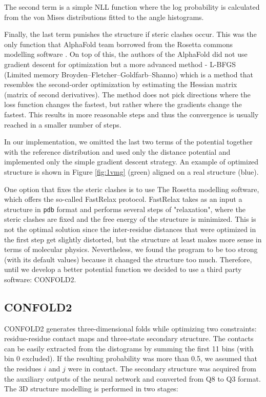 The second term is a simple NLL function where the log probability is calculated from the von Mises distributions fitted to the angle histograms.

Finally, the last term punishes the structure if steric clashes occur. This was the only function that AlphaFold team borrowed from the Rosetta commons modelling software \cite{rosettacommons}. On top of this, the authors of the AlphaFold did not use gradient descent for optimization but a more advanced method - L-BFGS (Limited memory Broyden–Fletcher–Goldfarb–Shanno) which is a method that resembles the second-order optimization by estimating the Hessian matrix (matrix of second derivatives). The method does not pick directions where the loss function changes the fastest, but rather where the gradients change the fastest. This results in more reasonable steps and thus the convergence is usually reached in a smaller number of steps.

In our implementation, we omitted the last two terms of the potential together with the reference distribution and used only the distance potential and implemented only the simple gradient descent strategy. An example of optimized structure is shown in Figure \ref{fig:1vmg} (green) aligned on a real structure (blue). 

One option that fixes the steric clashes is to use The Rosetta modelling software, which offers the so-called FastRelax protocol. 
FastRelax takes as an input a structure in \texttt{pdb} format and performs several steps of "relaxation", where the steric clashes are fixed and the free energy of the structure is minimized. 
This is not the optimal solution since the inter-residue distances that were optimized in the first step get slightly distorted, but the structure at least makes more sense in terms of molecular physics. 
Nevertheless, we found the program to be too strong (with its default values) because it changed the structure too much.
Therefore, until we develop a better potential function we decided to use a third party software: CONFOLD2. 

\subsection{CONFOLD2}

CONFOLD2 generates three-dimensional folds while optimizing two constraints: residue-residue contact maps and three-state secondary structure.
The contacts can be easily extracted from the distograms by summing the first 11 bins (with bin 0 excluded).
If the resulting probability was more than 0.5, we assumed that the residues $i$ and $j$ were in contact.
The secondary structure was acquired from the auxiliary outputs of the neural network and converted from Q8 to Q3 format.
The 3D structure modelling is performed in two stages:

